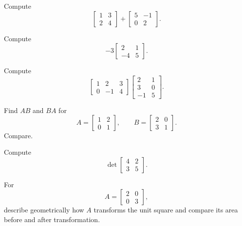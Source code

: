 \begin{exercise}[1]
Compute
\[ \begin{bmatrix}1&3\\2&4\end{bmatrix}
+\begin{bmatrix}5&-1\\0&2\end{bmatrix}. \]
\end{exercise}

\begin{exercise}[1]
Compute
\[ -3\begin{bmatrix}2&1\\-4&5\end{bmatrix}. \]
\end{exercise}

\begin{exercise}[2]
Compute
\[ \begin{bmatrix}1&2&3\\0&-1&4\end{bmatrix}
\begin{bmatrix}2&1\\3&0\\-1&5\end{bmatrix}. \]
\end{exercise}

\begin{exercise}[2]
Find \(AB\) and \(BA\) for
\[ A=\begin{bmatrix}1&2\\0&1\end{bmatrix},\qquad
B=\begin{bmatrix}2&0\\3&1\end{bmatrix}. \]
Compare.
\end{exercise}

\begin{exercise}[1]
Compute
\[ \det\begin{bmatrix}4&2\\3&5\end{bmatrix}. \]
\end{exercise}

\begin{exercise}[2]
For
\[ A=\begin{bmatrix}2&0\\0&3\end{bmatrix}, \]
describe geometrically how \(A\) transforms the unit square and compare its
area before and after transformation.
\end{exercise}

